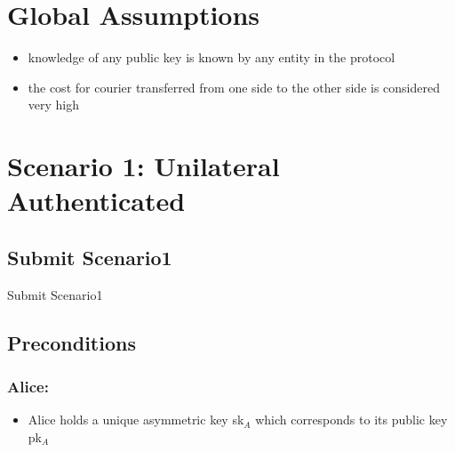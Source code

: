 \documentclass{article}
\begin{document}
\setlength{\marginparwidth}{20pt}

\section*{Global Assumptions}
\begin{itemize}
\item knowledge of any public key is known by any entity in the protocol
\item the cost for courier transferred from one side to the other side is considered very high
\end{itemize}
\vspace{20pt}

\section*{Scenario 1: Unilateral Authenticated}
\subsection*{Submit Scenario1}
\begin{msc}{Submit Scenario1}
\setlength{\instdist}{3\instdist}
\setlength{\envinstdist}{2\envinstdist}
\setlength{\levelheight}{1.5\levelheight}


\nextlevel
{}
\nextlevel
{}
\nextlevel
{}
\nextlevel[2]
\nextlevel
{}
\nextlevel[2]
\nextlevel
\end{msc}


\subsection*{Preconditions}
\subsubsection*{Alice:}
\begin{itemize}
\item Alice holds a unique asymmetric key sk$_A$ which corresponds to its public key pk$_A$
\end{itemize}
\end{document}
